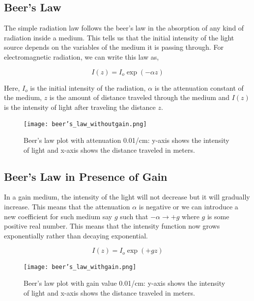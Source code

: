 \subsection{Beer's Law}
The simple radiation law follows the beer's law in the absorption of any kind of radiation inside a medium. This tells us that the initial intensity of the light source depends on the variables of the medium it is passing through. For electromagnetic radiation, we can write this law as,

\begin{equation}
I(z) = I_{o}\exp(-\alpha z)
\end{equation}

Here, $I_{o}$ is the initial intensity of the radiation, $\alpha$ is the attenuation constant of the medium, $z$ is the amount of distance traveled through the medium and $I(z)$ is the intensity of light after traveling the distance $z$.

\begin{figure}[h]
\centering
\texttt{[image: beer's\_law\_withoutgain.png]}
\caption{Beer's law plot with attenuation 0.01/cm: y-axis shows the intensity of light and x-axis shows the distance traveled in meters.}
\end{figure}


\subsection{Beer's Law in Presence of Gain}
In a gain medium, the intensity of the light will not decrease but it will gradually increase. This means that the attenuation $\alpha$ is negative or we can introduce a new coefficient for such medium say $g$ such that $-\alpha \to +g$ where $g$ is some positive real number. This means that the intensity function now grows exponentially rather than decaying exponential.

\begin{equation}
I(z) = I_{o}\exp( +g z)
\end{equation}

\begin{figure}[h]
\centering
\texttt{[image: beer's\_law\_withgain.png]}
\caption{Beer's law plot with gain value 0.01/cm: y-axis shows the intensity of light and x-axis shows the distance traveled in meters.}
\end{figure}

